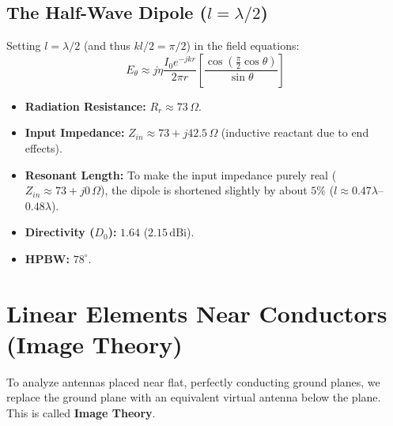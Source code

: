 \documentclass[12pt,a4paper]{article}
\begin{document}
\subsection{The Half-Wave Dipole (\texorpdfstring{$l = \lambda/2$}{l = lambda/2})}
Setting $l = \lambda/2$ (and thus $kl/2 = \pi/2$) in the field equations:
\[
E_\theta \approx j \eta \frac{I_0 e^{-jkr}}{2\pi r} \left[ \frac{\cos\left(\frac{\pi}{2}\cos\theta\right)}{\sin\theta} \right]
\]
\begin{itemize}[leftmargin=*, itemsep=3pt]
  \item \textbf{Radiation Resistance:} $R_r \approx 73\,\Omega$.
  \item \textbf{Input Impedance:} $Z_{in} \approx 73 + j 42.5\,\Omega$ (inductive reactant due to end effects).
  \item \textbf{Resonant Length:} To make the input impedance purely real ($Z_{in} \approx 73 + j0\,\Omega$), the dipole is shortened slightly by about $5\%$ ($l \approx 0.47\lambda$–$0.48\lambda$).
  \item \textbf{Directivity ($D_0$):} $1.64$ ($2.15\,\text{dBi}$).
  \item \textbf{HPBW:} $78^\circ$.
\end{itemize}

\section{Linear Elements Near Conductors (Image Theory)}

To analyze antennas placed near flat, perfectly conducting ground planes, we replace the ground plane with an equivalent virtual antenna below the plane. This is called \textbf{Image Theory}.
\end{document}
